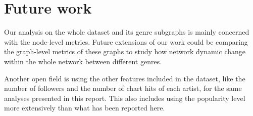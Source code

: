 \section{Future work}

Our analysis on the whole dataset and its genre subgraphs is mainly concerned with the node-level metrics. Future extensions of our work could be comparing the graph-level metrics of these graphs to study how network dynamic change within the whole network between different genres.

Another open field is using the other features included in the dataset, like the number of followers and the number of chart hits of each artist, for the same analyses presented in this report. This also includes using the popularity level more extensively than what has been reported here.